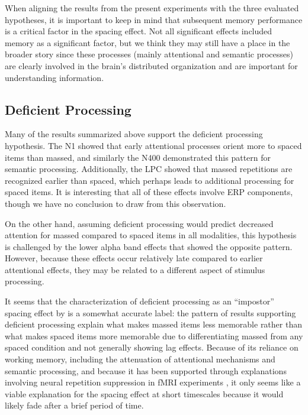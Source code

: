 When aligning the results from the present experiments with the three evaluated hypotheses, it is important to keep in mind that subsequent memory performance is a critical factor in the spacing effect.  Not all significant effects included memory as a significant factor, but we think they may still have a place in the broader story since these processes (mainly attentional and semantic processes) are clearly involved in the brain's distributed organization and are important for understanding information.

\subsection{Deficient Processing}

Many of the results summarized above support the deficient processing hypothesis.  The N1 showed that early attentional processes orient more to spaced items than massed, and similarly the N400 demonstrated this pattern for semantic processing.  Additionally, the LPC showed that massed repetitions are recognized earlier than spaced, which perhaps leads to additional processing for spaced items.  It is interesting that all of these effects involve ERP components, though we have no conclusion to draw from this observation.

On the other hand, assuming deficient processing would predict decreased attention for massed compared to spaced items in all modalities, this hypothesis is challenged by the lower alpha band effects that showed the opposite pattern.  However, because these effects occur relatively late compared to earlier attentional effects, they may be related to a different aspect of stimulus processing.

It seems that the characterization of deficient processing as an ``impostor'' spacing effect by  is a somewhat accurate label: the pattern of results supporting deficient processing explain what makes massed items less memorable rather than what makes spaced items more memorable due to differentiating massed from any spaced condition and not generally showing lag effects.
Because of its reliance on working memory, including the attenuation of attentional mechanisms and semantic processing, and because it has been supported through explanations involving neural repetition suppression in fMRI experiments \cite{CallSchw2010,XueEtal2011}, it only seems like a viable explanation for the spacing effect at short timescales because it would likely fade after a brief period of time.

